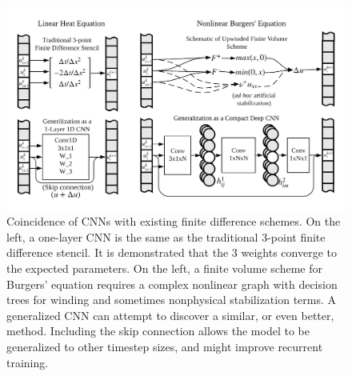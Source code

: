 \documentclass{article}
\begin{document}

\begin{figure}
  \centering
  \includegraphics[width=5in]{CNN_FDM.png}  
  \caption{\label{fig:cnn_fdm}Coincidence of CNNs with existing finite difference
    schemes. On the left, a one-layer CNN is the same as the traditional 3-point finite difference
    stencil. It is demonstrated that the 3 weights converge to the
    expected parameters. On the left, a finite volume scheme for
    Burgers' equation requires a complex nonlinear graph with
    decision trees for winding and sometimes nonphysical stabilization terms. A generalized CNN can attempt to
    discover a similar, or even better, method. Including the skip connection
    allows the model to be generalized to other timestep sizes, and
    might improve recurrent training.}
\end{figure}
\end{document}
